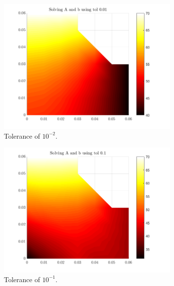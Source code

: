 \documentclass[12pt,a4paper]{article}
\begin{document}
\begin{figure}
\begin{subfigure}[b]{0.4\textwidth}
		\centering
		\includegraphics[width=\linewidth]{images/Comparisontol0-01.png}
		\caption{Tolerance of $10^{-2}$.}
		\label{fig:tol0.01}
	\end{subfigure}
	\hfill
	\begin{subfigure}[b]{0.4\textwidth}
		\centering
		\includegraphics[width=\linewidth]{images/Comparisontol0-1.png}
		\caption{Tolerance of $10^{-1}$.}
		\label{fig:tol0.1}
	\end{subfigure}
	\hfill
	\begin{subfigure}[b]{0.4\textwidth}
		\centering

\end{subfigure}
\end{figure}
\end{document}
